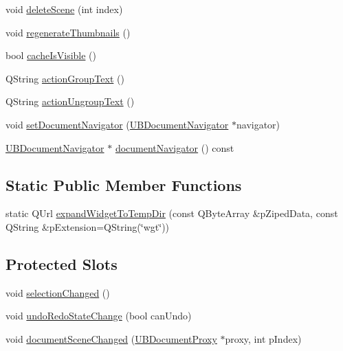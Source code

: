 \begin{DoxyCompactItemize}
\item 
void \hyperlink{class_u_b_board_controller_ad1c70c75fad194f67cd944e203d15e49}{delete\-Scene} (int index)
\item 
void \hyperlink{class_u_b_board_controller_a0702e13749c6107a18719f8a23502928}{regenerate\-Thumbnails} ()
\item 
bool \hyperlink{class_u_b_board_controller_a2b8761d022140db1a404a5732098f006}{cache\-Is\-Visible} ()
\item 
Q\-String \hyperlink{class_u_b_board_controller_a404dd737015b91b4762a749cf1e9fd3d}{action\-Group\-Text} ()
\item 
Q\-String \hyperlink{class_u_b_board_controller_a4812c63884b1d93772b8e527f6df8bbf}{action\-Ungroup\-Text} ()
\item 
void \hyperlink{class_u_b_board_controller_a0a0b45a4e32d982fe7c66e9fb336852e}{set\-Document\-Navigator} (\hyperlink{class_u_b_document_navigator}{U\-B\-Document\-Navigator} $\ast$navigator)
\item 
\hyperlink{class_u_b_document_navigator}{U\-B\-Document\-Navigator} $\ast$ \hyperlink{class_u_b_board_controller_af60596f4c84c7de83aae1473e033205b}{document\-Navigator} () const 
\end{DoxyCompactItemize}
\subsection*{Static Public Member Functions}
\begin{DoxyCompactItemize}
\item 
static Q\-Url \hyperlink{class_u_b_board_controller_a621157f18b63e9a4c2ac3e815277db4a}{expand\-Widget\-To\-Temp\-Dir} (const Q\-Byte\-Array \&p\-Ziped\-Data, const Q\-String \&p\-Extension=Q\-String(\char`\"{}wgt\char`\"{}))
\end{DoxyCompactItemize}
\subsection*{Protected Slots}
\begin{DoxyCompactItemize}
\item 
void \hyperlink{class_u_b_board_controller_a96fa840e0f2d01ea6d87c5123fba3985}{selection\-Changed} ()
\item 
void \hyperlink{class_u_b_board_controller_a0b4c8939c4b301f523681164e8abf803}{undo\-Redo\-State\-Change} (bool can\-Undo)
\item 
void \hyperlink{class_u_b_board_controller_adb6ca22449d2f5f0e8fc297c52a51f2c}{document\-Scene\-Changed} (\hyperlink{class_u_b_document_proxy}{U\-B\-Document\-Proxy} $\ast$proxy, int p\-Index)
\end{DoxyCompactItemize}
